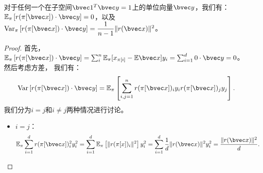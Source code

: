 \begin{theorem}
\label{thm:ss-perm:perm-dist}
    对于任何一个在子空间$\bvec 1^T \bvec y = 1$上的单位向量$\bvec y$，我们有：
    $\mathbb E_\pi \left[r(\pi[\bvec x])  \cdot \bvec y\right] = 0$，以及$\textnormal{Var}_\pi \left[ r(\pi[\bvec x])\cdot \bvec y \right] = \dfrac{1}{n - 1} \Vert r(\bvec x) \Vert^2$。
\end{theorem}
%
\begin{proof}
首先，$\mathbb E_\pi  \left[r(\pi[\bvec x]) \cdot \bvec y\right] = \sum_{i}^n \mathbb E_\pi [x_{\pi[i]} - \mathbb E\bvec x] y_i = \sum_{i=1}^d 0 \cdot \bvec y = 0$。然后考虑方差，
我们有：
\begin{equation}
\begin{split}
    \text{Var}\left[ r(\pi[\bvec x])\cdot \bvec y \right] = \mathbb E_\pi \left[\sum_{i,j=1}^n  r(\pi[\bvec x])_i y_i r(\pi[\bvec x])_j y_j \right].
\end{split}
\end{equation}
我们分为$i = j$和$i \ne j$两种情况进行讨论。
\begin{itemize}
    \item $i = j$：
    \begin{equation}
        \mathbb E_\pi \sum_{i = 1}^d r(\pi[\bvec x])_i^2 y_i^2 = \sum_{i=1}^d \mathbb E_\pi \left[ \Vert r(\pi[x])_i\Vert^2 \right] y_i^2 = \sum_{i=1}^d \dfrac{1}{d} \Vert r(\bvec x) \Vert^2 y_i^2 = \dfrac{\Vert r(\bvec x)\Vert^2}d.
    \end{equation}
    

\end{itemize}
\end{proof}
